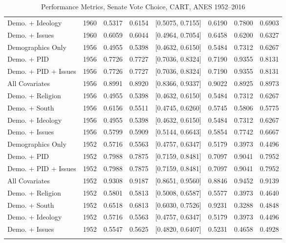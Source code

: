 \begin{longtable}{lrrrlrrr}
  Demo. + Ideology & 1960 & 0.5317 & 0.6154 & [0.5075, 0.7155] & 0.6190 & 0.7800 & 0.6903 \\ 
  Demo. + Issues & 1960 & 0.6059 & 0.6044 & [0.4964, 0.7054] & 0.6458 & 0.6200 & 0.6327 \\ 
  Demographics Only & 1956 & 0.4955 & 0.5398 & [0.4632, 0.6150] & 0.5484 & 0.7312 & 0.6267 \\ 
  Demo. + PID & 1956 & 0.7726 & 0.7727 & [0.7036, 0.8324] & 0.7190 & 0.9355 & 0.8131 \\ 
  Demo. + PID + Issues & 1956 & 0.7726 & 0.7727 & [0.7036, 0.8324] & 0.7190 & 0.9355 & 0.8131 \\ 
  All Covariates & 1956 & 0.8991 & 0.8920 & [0.8366, 0.9337] & 0.9022 & 0.8925 & 0.8973 \\ 
  Demo. + Religion & 1956 & 0.4955 & 0.5398 & [0.4632, 0.6150] & 0.5484 & 0.7312 & 0.6267 \\ 
  Demo. + South & 1956 & 0.6156 & 0.5511 & [0.4745, 0.6260] & 0.5745 & 0.5806 & 0.5775 \\ 
  Demo. + Ideology & 1956 & 0.4955 & 0.5398 & [0.4632, 0.6150] & 0.5484 & 0.7312 & 0.6267 \\ 
  Demo. + Issues & 1956 & 0.5799 & 0.5909 & [0.5144, 0.6643] & 0.5854 & 0.7742 & 0.6667 \\ 
  Demographics Only & 1952 & 0.5716 & 0.5563 & [0.4757, 0.6347] & 0.5179 & 0.3973 & 0.4496 \\ 
  Demo. + PID & 1952 & 0.7988 & 0.7875 & [0.7159, 0.8481] & 0.7097 & 0.9041 & 0.7952 \\ 
  Demo. + PID + Issues & 1952 & 0.7988 & 0.7875 & [0.7159, 0.8481] & 0.7097 & 0.9041 & 0.7952 \\ 
  All Covariates & 1952 & 0.9308 & 0.9187 & [0.8651, 0.9560] & 0.8846 & 0.9452 & 0.9139 \\ 
  Demo. + Religion & 1952 & 0.5801 & 0.5813 & [0.5008, 0.6587] & 0.5577 & 0.3973 & 0.4640 \\ 
  Demo. + South & 1952 & 0.6518 & 0.6813 & [0.6030, 0.7526] & 0.9231 & 0.3288 & 0.4848 \\ 
  Demo. + Ideology & 1952 & 0.5716 & 0.5563 & [0.4757, 0.6347] & 0.5179 & 0.3973 & 0.4496 \\ 
  Demo. + Issues & 1952 & 0.5547 & 0.5625 & [0.4820, 0.6407] & 0.5231 & 0.4658 & 0.4928 \\ 
   \bottomrule
\caption{Performance Metrics, Senate Vote Choice, CART, ANES 1952--2016} 
\label{tab:ANES_senate_cart}
\end{longtable}

